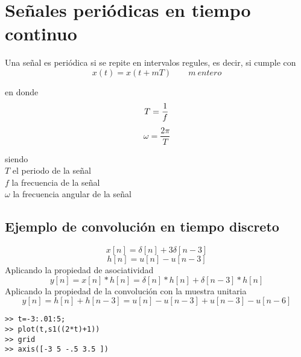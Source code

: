 \documentclass[10pt,a4paper]{report}
\begin{document}
%
\section{Señales periódicas en tiempo continuo}
Una señal es periódica si se repite en intervalos regules, es decir, si cumple con
\[x(t)=x(t+mT)  \qquad m \: entero\]

en donde
\[T=\frac{1}{f}\\  \]
\[\omega=\frac{2\pi}{T}  \]

siendo \\
$T$ el periodo de la señal\\
$f$ la frecuencia de la señal\\
$\omega$ la frecuencia angular de la señal

%
\vspace*{1cm}
\subsection{Ejemplo de convolución en tiempo discreto}
\[
x[n]=\delta[n]+3\delta[n-3]
\]
\[
h[n]=u[n]-u[n-3]
\]
Aplicando la propiedad de asociatividad
\[
y[n]=x[n]*h[n]=\delta[n]*h[n]+\delta[n-3]*h[n]
\]
Aplicando la propiedad de la convolución con la muestra unitaria
\[
y[n]=h[n]+h[n-3]=u[n]-u[n-3]+u[n-3]-u[n-6]
\]
\begin{lstlisting}[frame=single]
>> t=-3:.01:5;
>> plot(t,s1((2*t)+1))
>> grid
>> axis([-3 5 -.5 3.5 ])
\end{lstlisting}
\end{document}
